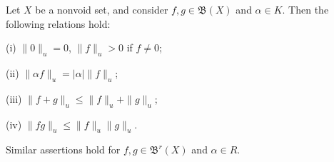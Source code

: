 Let $X$ be a nonvoid set, and consider $f, g \in \mathfrak{B}(X)$ and $\alpha \in K$. Then the following relations hold:

(i) $\|0\|_u = 0$, $\|f\|_u > 0$ if $f \neq 0$;

(ii) $\|\alpha f\|_u = |\alpha| \|f\|_u$;

(iii) $\|f + g\|_u \leq \|f\|_u + \|g\|_u$;

(iv) $\|fg\|_u \leq \|f\|_u \|g\|_u$.

Similar assertions hold for $f, g \in \mathfrak{B}^r(X)$ and $\alpha \in R$.